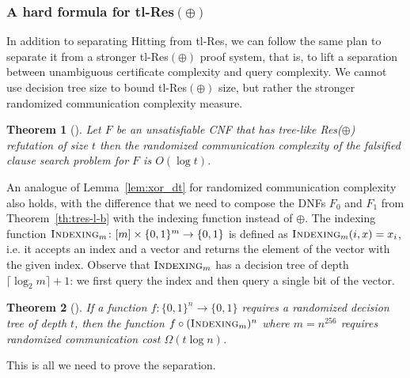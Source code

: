 \documentclass[11pt]{article}
\newcommand{\scterm}[1]{{\textrm{\sc #1}}}
\newcommand{\hit}{\scterm{Hitting}}
\newcommand{\tres}{\scterm{tl-Res}}
\newcommand{\tresp}{{\tres}$(\oplus)$}
\newcommand{\indexing}{\scterm{Indexing}}
\numberwithin{equation}{section}
\newtheorem{theorem}{Theorem}[section]
\begin{document}
 

\subsubsection{A hard formula for \texorpdfstring{{\tresp}}{tl-Res(xor)}}

In addition to separating {\hit} from {\tres}, we can follow the same plan to separate it from a stronger {\tresp} proof system, that is, to lift a separation between unambiguous certificate complexity and query complexity. We cannot use decision tree size to bound {\tresp} size, but rather the stronger randomized communication complexity measure.

\begin{theorem}[{\cite[Theorem~3.11]{IS20}}]
\label{th:res-parity-communication-sim}
  Let $F$ be an unsatisfiable CNF that has tree-like Res($\oplus$) refutation of size $t$ then the randomized communication complexity of the falsified clause search problem for $F$ is $O(\log t)$.
\end{theorem}

An analogue of Lemma~\ref{lem:xor_dt} for randomized communication complexity also holds, with the difference that we need to compose the DNFs $F_0$ and $F_1$ from Theorem~\ref{th:tres-l-b} with the indexing function instead of $\oplus$.
%
The indexing function $\indexing_m\colon [m] \times \{0,1\}^m \to \{0,1\}$ is defined as  $\indexing_m(i, x) = x_i$, i.e. it accepts an index and a vector and returns the element of the vector with the given index. Observe that $\indexing_m$ has a decision tree of depth $\lceil \log_2 m \rceil + 1$: we first query the index and then query a single bit of the vector.

\begin{theorem}[\cite{GPW17}]
\label{th:randomized-lifting}
    If a function $f\colon \{0,1\}^n \to \{0,1\}$ requires a randomized decision tree of depth $t$, then the function $f \circ (\indexing_m)^n$ where $m=n^{256}$ requires randomized communication cost $\Omega(t \log n)$.
\end{theorem}

This is all we need to prove the separation.
\end{document}
